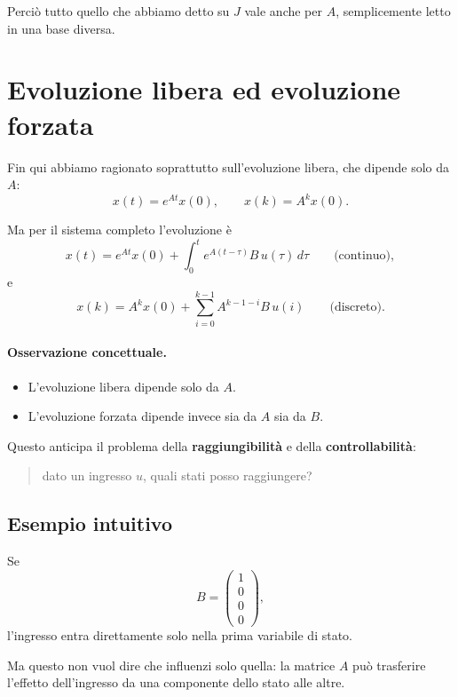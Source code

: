 Perciò tutto quello che abbiamo detto su $J$ vale anche per $A$, semplicemente letto in una base diversa.

\section{Evoluzione libera ed evoluzione forzata}

Fin qui abbiamo ragionato soprattutto sull'evoluzione libera, che dipende solo da $A$:
\[
x(t)=e^{At}x(0),
\qquad
x(k)=A^k x(0).
\]

Ma per il sistema completo l'evoluzione è
\begin{equation}
x(t)=e^{At}x(0)+\int_0^t e^{A(t-\tau)}B\,u(\tau)\,d\tau
\qquad \text{(continuo)},
\label{eq:L10_forced_CT}
\end{equation}
e
\begin{equation}
x(k)=A^k x(0)+\sum_{i=0}^{k-1}A^{k-1-i}B\,u(i)
\qquad \text{(discreto)}.
\label{eq:L10_forced_DT}
\end{equation}

\paragraph{Osservazione concettuale.}
\begin{itemize}
    \item L'evoluzione libera dipende solo da $A$.
    \item L'evoluzione forzata dipende invece sia da $A$ sia da $B$.
\end{itemize}

Questo anticipa il problema della \textbf{raggiungibilità} e della \textbf{controllabilità}:
\begin{quote}
dato un ingresso $u$, quali stati posso raggiungere?
\end{quote}

\subsection{Esempio intuitivo}

Se
\[
B=
\begin{pmatrix}
1\\0\\0\\0
\end{pmatrix},
\]
l'ingresso entra direttamente solo nella prima variabile di stato.

Ma questo non vuol dire che influenzi solo quella: la matrice $A$ può trasferire l'effetto dell'ingresso da una componente dello stato alle altre.

